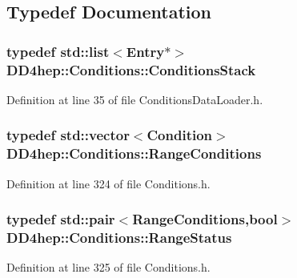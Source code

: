 \subsection{Typedef Documentation}
\hypertarget{namespace_d_d4hep_1_1_conditions_ac894ba79dbc97adf0ab8143bdd8bd2e3}{
\subsubsection[{ConditionsStack}]{\setlength{\rightskip}{0pt plus 5cm}typedef std::list$<${\bf Entry}$\ast$$>$ {\bf DD4hep::Conditions::ConditionsStack}}}
\label{namespace_d_d4hep_1_1_conditions_ac894ba79dbc97adf0ab8143bdd8bd2e3}


Definition at line 35 of file ConditionsDataLoader.h.\hypertarget{namespace_d_d4hep_1_1_conditions_ae765f0140a33973a430280f02b6062f4}{
\subsubsection[{RangeConditions}]{\setlength{\rightskip}{0pt plus 5cm}typedef std::vector$<${\bf Condition}$>$ {\bf DD4hep::Conditions::RangeConditions}}}
\label{namespace_d_d4hep_1_1_conditions_ae765f0140a33973a430280f02b6062f4}


Definition at line 324 of file Conditions.h.\hypertarget{namespace_d_d4hep_1_1_conditions_a6fa51615b9757a9ffccb7377f0617ee4}{
\subsubsection[{RangeStatus}]{\setlength{\rightskip}{0pt plus 5cm}typedef std::pair$<${\bf RangeConditions},bool$>$ {\bf DD4hep::Conditions::RangeStatus}}}
\label{namespace_d_d4hep_1_1_conditions_a6fa51615b9757a9ffccb7377f0617ee4}


Definition at line 325 of file Conditions.h.

